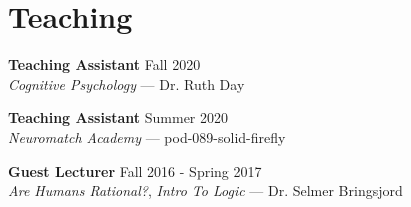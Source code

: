 \section{Teaching}
\textbf{Teaching Assistant} \hfill Fall 2020 \\
\emph{Cognitive Psychology} --- Dr. Ruth Day

\textbf{Teaching Assistant} \hfill Summer 2020 \\
\emph{Neuromatch Academy} --- pod-089-solid-firefly

\textbf{Guest Lecturer} \hfill Fall 2016 - Spring 2017 \\
\emph{Are Humans Rational?}, \emph{Intro To Logic} --- Dr. Selmer Bringsjord
